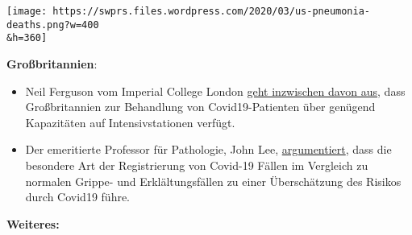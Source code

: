 \texttt{[image: https://swprs.files.wordpress.com/2020/03/us-pneumonia-deaths.png?w=400\\\&h=360]}

\textbf{Großbritannien}:

\begin{itemize}
\tightlist
\item
  Neil Ferguson vom Imperial College London
  \href{https://www.newscientist.com/article/2238578-uk-has-enough-intensive-care-units-for-coronavirus-expert-predicts/}{geht
  inzwischen davon aus}, dass Großbritannien zur Behandlung von
  Covid19-Patienten über genügend Kapazitäten auf Intensivstationen
  verfügt.
\item
  Der emeritierte Professor für Pathologie, John Lee,
  \href{https://www.spectator.co.uk/article/The-evidence-on-Covid-19-is-not-as-clear-as-we-think}{argumentiert},
  dass die besondere Art der Registrierung von Covid-19 Fällen im
  Vergleich zu normalen Grippe- und Erklältungsfällen zu einer
  Überschätzung des Risikos durch Covid19 führe.
\end{itemize}

\textbf{Weiteres:}

